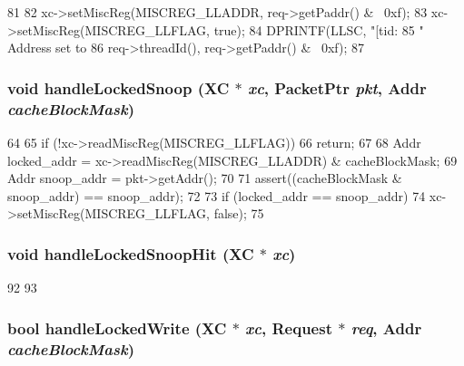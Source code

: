 \begin{DoxyCode}
81 {
82     xc->setMiscReg(MISCREG_LLADDR, req->getPaddr() & ~0xf);
83     xc->setMiscReg(MISCREG_LLFLAG, true);
84     DPRINTF(LLSC, "[tid:%
85                   " Address set to %
86             req->threadId(), req->getPaddr() & ~0xf);
87 }
\end{DoxyCode}
\hypertarget{namespaceMipsISA_a5f9bf68eab13cc8599dadd035bb3a45e}{
\subsubsection[{handleLockedSnoop}]{\setlength{\rightskip}{0pt plus 5cm}void handleLockedSnoop (XC $\ast$ {\em xc}, \/  {\bf PacketPtr} {\em pkt}, \/  {\bf Addr} {\em cacheBlockMask})}}
\label{namespaceMipsISA_a5f9bf68eab13cc8599dadd035bb3a45e}



\begin{DoxyCode}
64 {
65     if (!xc->readMiscReg(MISCREG_LLFLAG))
66         return;
67 
68     Addr locked_addr = xc->readMiscReg(MISCREG_LLADDR) & cacheBlockMask;
69     Addr snoop_addr = pkt->getAddr();
70 
71     assert((cacheBlockMask & snoop_addr) == snoop_addr);
72 
73     if (locked_addr == snoop_addr)
74         xc->setMiscReg(MISCREG_LLFLAG, false);
75 }
\end{DoxyCode}
\hypertarget{namespaceMipsISA_a6212c59e93e2406923f9f1f3c6aabc9f}{
\subsubsection[{handleLockedSnoopHit}]{\setlength{\rightskip}{0pt plus 5cm}void handleLockedSnoopHit (XC $\ast$ {\em xc})}}
\label{namespaceMipsISA_a6212c59e93e2406923f9f1f3c6aabc9f}



\begin{DoxyCode}
92 {
93 }
\end{DoxyCode}
\hypertarget{namespaceMipsISA_afc30934f8d6d2afd2ff8f255ab6653ba}{
\subsubsection[{handleLockedWrite}]{\setlength{\rightskip}{0pt plus 5cm}bool handleLockedWrite (XC $\ast$ {\em xc}, \/  {\bf Request} $\ast$ {\em req}, \/  {\bf Addr} {\em cacheBlockMask})}}
\label{namespaceMipsISA_afc30934f8d6d2afd2ff8f255ab6653ba}



